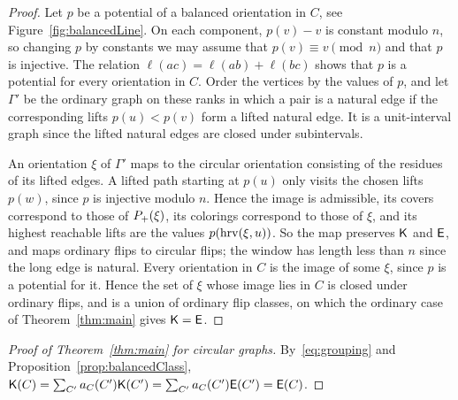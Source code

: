 \begin{proof}
Let $p$ be a potential of a balanced orientation in $C$, see
Figure~\ref{fig:balancedLine}.
On each component, $p(v)-v$ is constant modulo $n$, so changing $p$ by constants
we may assume that $p(v)\equiv v\pmod n$ and that $p$ is injective.
The relation $\ell(ac)=\ell(ab)+\ell(bc)$ shows that $p$ is a potential for every
orientation in $C$.
Order the vertices by the values of $p$, and let $\Gamma'$ be the ordinary graph on
these ranks in which a pair is a natural edge if the corresponding lifts
$p(u)<p(v)$ form a lifted natural edge.
It is a unit-interval graph since the lifted natural edges are closed under
subintervals.

An orientation $\xi$ of $\Gamma'$ maps to the circular orientation consisting of the
residues of its lifted edges.
A lifted path starting at $p(u)$ only visits the chosen lifts $p(w)$, since
$p$ is injective modulo $n$.
Hence the image is admissible, its covers correspond to those of
$P_{+}(\xi)$, its colorings correspond to those of $\xi$, and its highest
reachable lifts are the values $p(\operatorname{hrv}(\xi,u))$.
So the map preserves $\mathsf{K}$ and $\mathsf{E}$, and maps ordinary flips to circular flips;
the window has length less than $n$ since the long edge is natural.
Every orientation in $C$ is the image of some $\xi$, since $p$ is a potential for
it.
Hence the set of $\xi$ whose image lies in $C$ is closed under ordinary flips,
and is a union of ordinary flip classes, on which the ordinary case of
Theorem~\ref{thm:main} gives $\mathsf{K}=\mathsf{E}$.
\end{proof}

\begin{proof}[Proof of Theorem~\ref{thm:main} for circular graphs]
By~\eqref{eq:grouping} and Proposition~\ref{prop:balancedClass},
$\mathsf{K}(C)=\sum_{C'}a_C(C')\mathsf{K}(C')=\sum_{C'}a_C(C')\mathsf{E}(C')=\mathsf{E}(C)$.
\end{proof}
